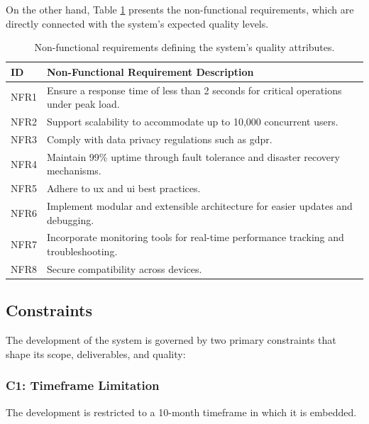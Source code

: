 On the other hand, Table \ref{tab:nonfunctional_requirements} presents the non-functional requirements, which are directly connected with the system's expected quality levels.

\begin{table}[!htb]
\centering
\begin{tabular}{|p{}|p{}|}
\hline
\textbf{ID} & \textbf{Non-Functional Requirement Description} \\ \hline
NFR1 & Ensure a response time of less than 2 seconds for critical operations under peak load. \\ \hline
NFR2 & Support scalability to accommodate up to 10,000 concurrent users. \\ \hline
NFR3 & Comply with data privacy regulations such as \ac{gdpr}. \\ \hline
NFR4 & Maintain 99\% uptime through fault tolerance and disaster recovery mechanisms. \\ \hline
NFR5 & Adhere to \ac{ux} and \ac{ui} best practices. \\ \hline
NFR6 & Implement modular and extensible architecture for easier updates and debugging. \\ \hline
NFR7 & Incorporate monitoring tools for real-time performance tracking and troubleshooting. \\ \hline
NFR8 & Secure compatibility across devices. \\ \hline
\end{tabular}
\caption[Non-Functional Requirements]{Non-functional requirements defining the system's quality attributes.}
\label{tab:nonfunctional_requirements}
\end{table}



\subsection{Constraints} \label{section:constraints}

The development of the system is governed by two primary constraints that shape its scope, deliverables, and quality:

\subsubsection{C1: Timeframe Limitation}

The development is restricted to a 10-month timeframe in which it is embedded.

